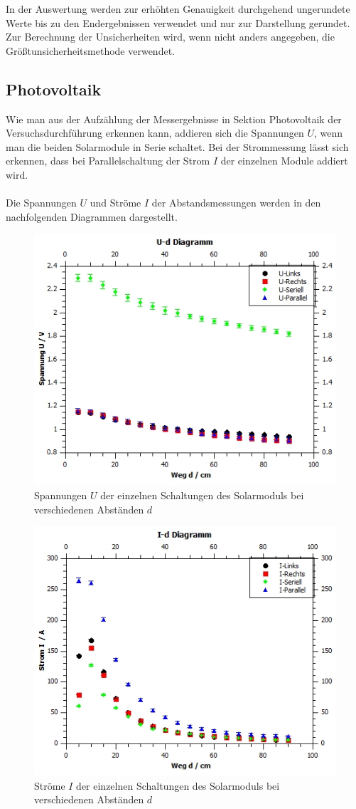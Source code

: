 \documentclass[12pt,a4paper,twoside]{article}
\begin{document}
In der Auswertung werden zur erhöhten Genauigkeit durchgehend ungerundete Werte bis zu den Endergebnissen verwendet und nur zur Darstellung gerundet. \\
Zur Berechnung der Unsicherheiten wird, wenn nicht anders angegeben, die Größtunsicherheitsmethode verwendet.

\subsection{Photovoltaik}
Wie man aus der Aufzählung der Messergebnisse in Sektion Photovoltaik der Versuchsdurchführung erkennen kann, 
addieren sich die Spannungen $U$, wenn man die beiden Solarmodule in Serie schaltet. Bei der Strommessung lässt sich erkennen, dass bei Parallelschaltung der Strom $I$ der einzelnen Module addiert wird. 
\\
\\
Die Spannungen $U$ und Ströme $I$ der Abstandsmessungen werden in den nachfolgenden Diagrammen dargestellt. 

\begin{figure}[H]
    \centering
    \includegraphics[width=0.6\linewidth]{nudes/u-d diagramm.jpg}
    \caption{Spannungen $U$ der einzelnen Schaltungen des Solarmoduls bei verschiedenen Abständen $d$}
    \label{fig:diagramm Photovoltaik U-d}
\end{figure}

\begin{figure}[H]
    \centering
    \includegraphics[width=0.6\linewidth]{nudes/i-d diagramm.jpg}
    \caption{Ströme $I$ der einzelnen Schaltungen des Solarmoduls bei verschiedenen Abständen $d$}
    \label{fig:diagramm Photovoltaik I-d}
\end{figure}
\end{document}
